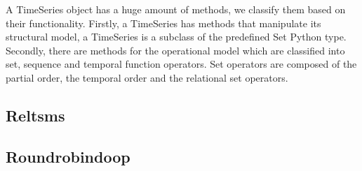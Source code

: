 


A TimeSeries object has a huge amount of methods, we classify them
based on their functionality. Firstly, a TimeSeries has methods that
manipulate its structural model, a TimeSeries is a subclass of the
predefined Set Python type. Secondly, there are methods for the
operational model which are classified into set, sequence and temporal
function operators.  Set operators are composed of the partial order, the
temporal order and the relational set operators.




\subsection{Reltsms}

\todo{}


\subsection{Roundrobindoop}

\todo{}



